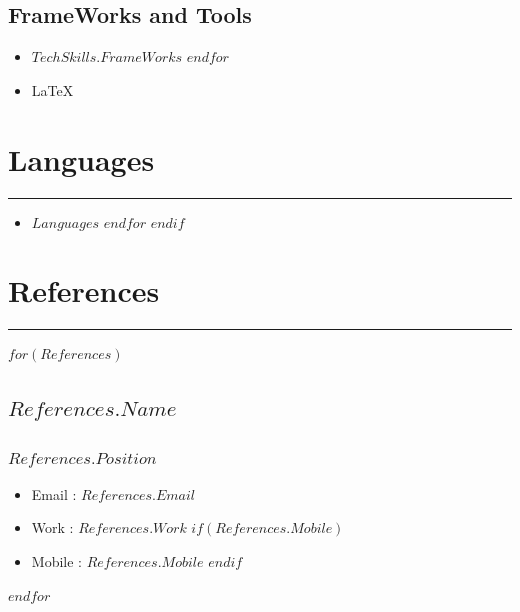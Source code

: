 \documentclass[$fontsize$, a4paper]{article}
\begin{document}
\begin{adjustwidth}{5pt}{5pt}
\begin{multicols*}{2}
\begin{multicols*}{2}
                    \subsection*{FrameWorks and Tools}
                        \begin{itemize}
                            $for(TechSkills.FrameWorks)$
                                \item $TechSkills.FrameWorks$
                            $endfor$
                            \item \LaTeX
                        \end{itemize}
                \end{multicols*}
        \section*{Languages}
        \textcolor{RoyalBlue}{\noindent\rule{\linewidth}{1pt}}
            \begin{itemize} [noitemsep]
                $if(Languages)$
                    $for(Languages)$
                        \item $Languages$
                    $endfor$
                $endif$
            \end{itemize}
        \section*{References}
        \textcolor{RoyalBlue}{\noindent\rule{\linewidth}{1pt}}
        $for(References)$
            \subsection*{$References.Name$
            }
            \subsubsection*{
            $References.Position$}
            \begin{itemize} [noitemsep]
                \item  Email : $References.Email$
                \item  Work : $References.Work$
                $if(References.Mobile)$
                \item  Mobile : $References.Mobile$
                $endif$
            \end{itemize}
                    
            $endfor$
        \end{multicols*}
    \end{adjustwidth}

  
\end{document}
